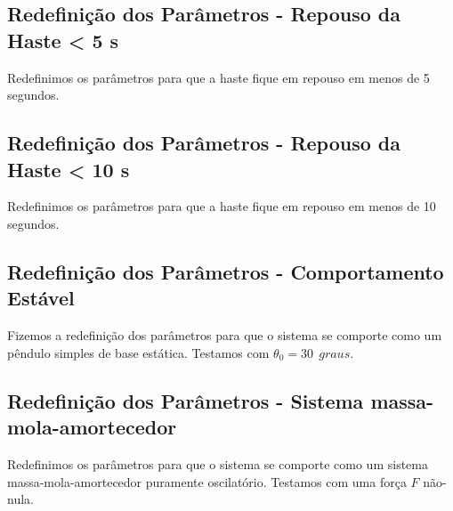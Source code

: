\documentclass[a4paper, 12pt]{article}
\begin{document}
\subsection{Redefinição dos Parâmetros - Repouso da Haste < 5 s}
Redefinimos os parâmetros para que a haste fique em repouso em menos de 5 segundos. %

\subsection{Redefinição dos Parâmetros - Repouso da Haste < 10 s}
Redefinimos os parâmetros para que a haste fique em repouso em menos de 10 segundos. %

\subsection{Redefinição dos Parâmetros - Comportamento Estável}
Fizemos a redefinição dos parâmetros para que o sistema se comporte como um pêndulo simples de base estática. Testamos com $\theta_0 = 30 \>\ graus$. %


\subsection{Redefinição dos Parâmetros - Sistema massa-mola-amortecedor}
Redefinimos os parâmetros para que o sistema se comporte como um sistema massa-mola-amortecedor puramente oscilatório. Testamos com uma força $F$ não-nula. %


\newpage
    \nocite{*}
    
    
\end{document}
